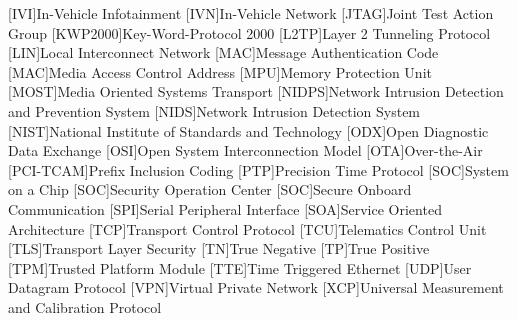 \begin{acronym}
[IVI]{In-Vehicle Infotainment}
[IVN]{In-Vehicle Network}
[JTAG]{Joint Test Action Group}
[KWP2000]{Key-Word-Protocol 2000}
[L2TP]{Layer 2 Tunneling Protocol}
[LIN]{Local Interconnect Network}
[MAC]{Message Authentication Code} 	%
[MAC]{Media Access Control Address}	%
[MPU]{Memory Protection Unit}
[MOST]{Media Oriented Systems Transport}
[NIDPS]{Network Intrusion Detection and Prevention System}
[NIDS]{Network Intrusion Detection System}
[NIST]{National Institute of Standards and Technology}
[ODX]{Open Diagnostic Data Exchange}
[OSI]{Open System Interconnection Model}
[OTA]{Over-the-Air}
[PCI-TCAM]{Prefix Inclusion Coding} 				%
[PTP]{Precision Time Protocol}
[SOC]{System on a Chip}
[SOC]{Security Operation Center}
[SOC]{Secure Onboard Communication}          %
[SPI]{Serial Peripheral Interface}
[SOA]{Service Oriented Architecture}
[TCP]{Transport Control Protocol}
[TCU]{Telematics Control Unit}
[TLS]{Transport Layer Security}
[TN]{True Negative}
[TP]{True Positive}
[TPM]{Trusted Platform Module}
[TTE]{Time Triggered Ethernet}		%
[UDP]{User Datagram Protocol}
[VPN]{Virtual Private Network}
[XCP]{Universal Measurement and Calibration Protocol}
\end{acronym} 
